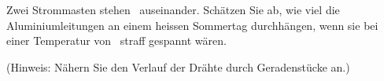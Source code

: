 Zwei Strommasten stehen \lMaO\ auseinander. Schätzen Sie ab, wie viel die Aluminiumleitungen an einem heissen Sommertag durchhängen, wenn sie bei einer Temperatur von \TKaO\ straff gespannt wären.

(Hinweis: Nähern Sie den Verlauf der Drähte durch Geradenstücke an.)
